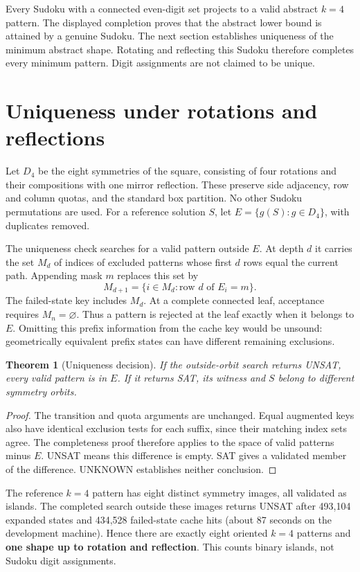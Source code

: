 \documentclass[11pt,a4paper]{article}
\newtheorem{theorem}{Theorem}
\begin{document}
Every Sudoku with a connected even-digit set projects to a valid abstract
$k=4$ pattern. The displayed completion proves that the abstract lower bound
is attained by a genuine Sudoku. The next section establishes uniqueness of
the minimum abstract shape. Rotating and reflecting this Sudoku therefore
completes every minimum pattern. Digit assignments are not claimed to be unique.

\clearpage
\section{Uniqueness under rotations and reflections}
Let $D_4$ be the eight symmetries of the square, consisting of four rotations
and their compositions with one mirror reflection. These preserve side
adjacency, row and column quotas, and the standard box partition. No other
Sudoku permutations are used. For a reference solution $S$, let
$E=\{g(S):g\in D_4\}$, with duplicates removed.

The uniqueness check searches for a valid pattern outside $E$. At depth $d$
it carries the set $M_d$ of indices of excluded patterns whose first $d$ rows
equal the current path. Appending mask $m$ replaces this set by
\[
 M_{d+1}=\{i\in M_d : \text{row }d\text{ of }E_i=m\}.
\]
The failed-state key includes $M_d$. At a complete connected leaf, acceptance
requires $M_n=\varnothing$. Thus a pattern is rejected at the leaf exactly when
it belongs to $E$. Omitting this prefix information from the cache key would
be unsound: geometrically equivalent prefix states can have different
remaining exclusions.

\begin{theorem}[Uniqueness decision]
If the outside-orbit search returns UNSAT, every valid pattern is in $E$.
If it returns SAT, its witness and $S$ belong to different symmetry orbits.
\end{theorem}
\begin{proof}
The transition and quota arguments are unchanged. Equal augmented keys
also have identical exclusion tests for each suffix, since their matching
index sets agree. The completeness proof therefore applies to the space
of valid patterns minus $E$. UNSAT means this difference is empty. SAT gives
a validated member of the difference. UNKNOWN establishes neither conclusion.
\end{proof}

The reference $k=4$ pattern has eight distinct symmetry images, all validated
as islands. The completed search outside these images returns UNSAT after
493,104 expanded states and 434,528 failed-state cache hits (about 87 seconds
on the development machine). Hence there are exactly eight oriented
$k=4$ patterns and \textbf{one shape up to rotation and reflection}.
This counts binary islands, not Sudoku digit assignments.
\end{document}
